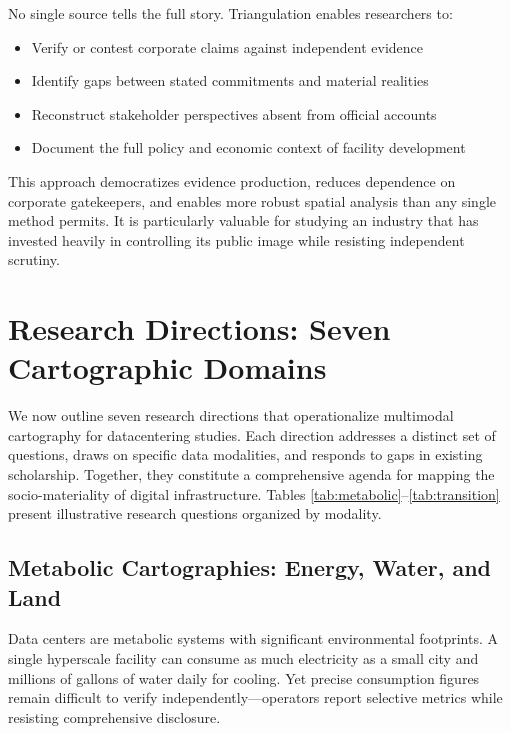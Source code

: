 \documentclass[review]{elsarticle}
\begin{document}
No single source tells the full story. Triangulation enables researchers to:

\begin{itemize}
    \item Verify or contest corporate claims against independent evidence
    \item Identify gaps between stated commitments and material realities
    \item Reconstruct stakeholder perspectives absent from official accounts
    \item Document the full policy and economic context of facility development
\end{itemize}

This approach democratizes evidence production, reduces dependence on corporate gatekeepers, and enables more robust spatial analysis than any single method permits. It is particularly valuable for studying an industry that has invested heavily in controlling its public image while resisting independent scrutiny.

\section{Research Directions: Seven Cartographic Domains}

We now outline seven research directions that operationalize multimodal cartography for datacentering studies. Each direction addresses a distinct set of questions, draws on specific data modalities, and responds to gaps in existing scholarship. Together, they constitute a comprehensive agenda for mapping the socio-materiality of digital infrastructure. Tables \ref{tab:metabolic}--\ref{tab:transition} present illustrative research questions organized by modality.

\subsection{Metabolic Cartographies: Energy, Water, and Land}

Data centers are metabolic systems with significant environmental footprints. A single hyperscale facility can consume as much electricity as a small city and millions of gallons of water daily for cooling. Yet precise consumption figures remain difficult to verify independently---operators report selective metrics while resisting comprehensive disclosure.
\end{document}
